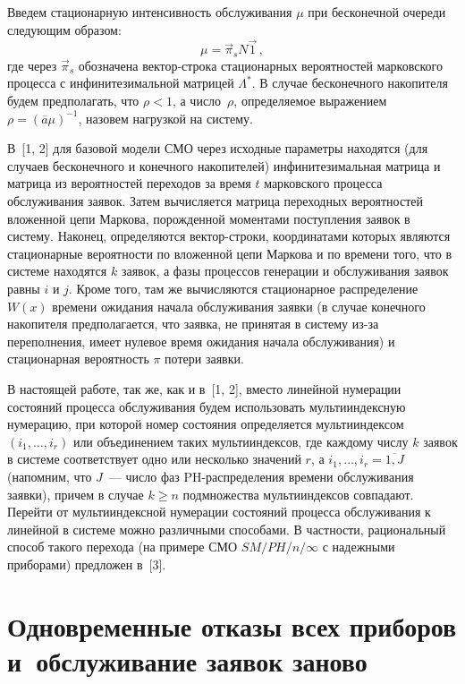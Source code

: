 \begin{multicols}{2}
Введем стационарную интенсивность обслуживания $\mu$ при
бесконечной очереди следующим образом:
$$
\label{mu_general}
\mu = \vec \pi_s N \vec1\,,
$$
где через $\vec\pi_s$ обозначена вектор-строка стационарных
вероятностей марковского процесса  с инфинитезимальной матрицей
$\Lambda^*$.
В случае бесконечного накопителя будем предполагать, что $\rho<1$,
а число~$\rho$, определяемое выражением
$\rho = (\overline a \mu)^{-1}$, назовем нагрузкой на систему.

В~[1, 2] для базовой модели СМО через исходные параметры находятся
(для случаев бесконечного и конечного накопителей) инфинитезимальная
мат\-ри\-ца и матрица из вероятностей переходов за время $t$ марковского
процесса обслуживания заявок.
Затем вычисляется матрица
переходных вероятностей вложенной цепи Маркова, порожденной моментами
поступления заявок в систему.
Наконец, определяются вектор-строки, координатами
которых являются стационарные вероятности по вложенной цепи Маркова и
по времени того, что в системе находятся $k$ заявок, а фазы процессов
генерации и обслуживания заявок равны $i$ и $j$.
Кроме того, там же вычисляются стационарное распределение $W(x)$
времени ожидания начала обслуживания заявки (в случае конечного
накопителя предполагается, что заявка, не принятая в систему из-за
переполнения, имеет нулевое время ожидания начала обслуживания) и
стационарная вероятность $\pi$ потери заявки.

В настоящей работе, так же, как и в~[1, 2], вмес\-то линейной
нумерации состояний процесса обслуживания будем использовать
мультииндексную нумерацию, при которой номер состояния определяется
мультииндексом $(i_1,\ldots,i_r)$ или объединением таких
мультииндексов, где каждому числу $k$ заявок в системе соответствует
одно или несколько значений $r$, а $i_1,\ldots,i_r=\overline{1,J}$
(напомним, что $J$~--- число фаз PH-распределения времени
обслуживания заявки), причем в случае $k\ge n$ подмножества
мультииндексов совпадают.
Перейти от мультииндексной нумерации состояний процесса обслуживания
к линейной в системе можно различными способами.
В частности, рациональный способ такого перехода (на примере СМО
$SM/PH/n/\infty$ с надежными приборами) предложен в~[3].

\section{Одновременные отказы всех приборов
и~обслуживание заявок заново}                                %


\end{multicols}
